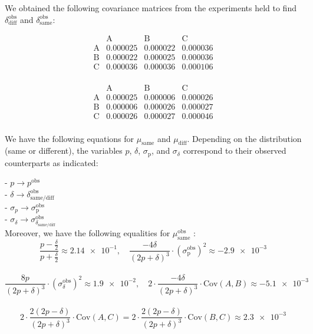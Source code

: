 We obtained the following covariance matrices from the experiments held to find \(\delta^{\text{obs}}_{\text{diff}}\) and \(\delta^{\text{obs}}_{\text{same}}\):

\[
\begin{array}{c|ccc}
           & \text{A} & \text{B} & \text{C} \\
\hline
\text{A} & 0.000025 & 0.000022 & 0.000036 \\
\text{B} & 0.000022 & 0.000025 & 0.000036 \\
\text{C} & 0.000036 & 0.000036 & 0.000106 \\
\end{array}
\]
\begin{center}\end{center}


\[
\begin{array}{c|ccc}
           & \text{A} & \text{B} & \text{C} \\
\hline
\text{A} & 0.000025 & 0.000006 & 0.000026 \\
\text{B} & 0.000006 & 0.000026 & 0.000027 \\
\text{C}  & 0.000026 & 0.000027 & 0.000046 \\
\end{array}
\]
\begin{center}\end{center}

We have the following equations for \(\mu_{\text{same}}\) and \(\mu_{\text{diff}}\). Depending on the distribution (same or different), the variables \(p\), \(\delta\), \(\sigma_{\text{p}}\), and \(\sigma_\delta\) correspond to their observed counterparts as indicated:

- \(p \rightarrow p^{\text{obs}}\)\\
- \(\delta \rightarrow \delta_{\text{same/diff}}^{\text{obs}}\)\\
- \(\sigma_p \rightarrow \sigma_{\text{p}}^{\text{obs}}\)\\
- \(\sigma_\delta \rightarrow \sigma_{\delta_{\text{same/diff}}}^{\text{obs}}\)\\

Moreover, we have the following equalities for \( \mu_{\text{same}}^{\text{obs}} \) :
 \[
    \frac{p - \frac{\delta}{2}}{p + \frac{\delta}{2}} \approx \num{2.14e-1}, \quad \frac{-4\delta}{(2p + \delta)^3}\cdot({\sigma^\text{obs}_{\text{p}}})^2 \approx -\num{2.9e-3}
 \]\\
 \[
    \frac{8p}{(2p + \delta)^3}\cdot({\sigma^\text{obs}_\delta})^2 \approx \num{1.9e-2}, \quad 2\cdot\frac{-4\delta}{(2p + \delta)^3}\cdot\text{Cov}(A,B) \approx -\num{5.1e-3}
 \]\\
 \[
    2\cdot\frac{2(2p - \delta)}{(2p + \delta)^3}\cdot\text{Cov}(A,C) = 2\cdot\frac{2(2p - \delta)}{(2p + \delta)^3}\cdot\text{Cov}(B,C) \approx \num{2.3e-3}
 \]

